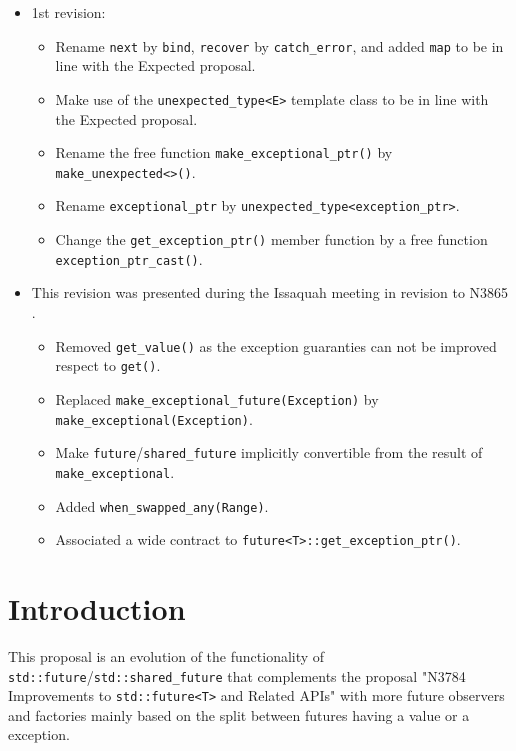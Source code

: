 \documentclass[a4paper,10pt]{article}
\newcommand{\cpp}[1]{\lstinline{#1}}
\newcommand{\update}[1]{\colorbox{update_color}{#1}}
\begin{document}
\begin{itemize}
\item \update{1st revision: }
\begin{itemize}
\item \update{Rename \cpp{next} by  \cpp{bind},  \cpp{recover} by  \cpp{catch_error}, and added  \cpp{map} to be in line with the Expected proposal.}
\item \update{Make use of the  \cpp{unexpected_type<E>} template class to be in line with the Expected proposal.}
\item \update{Rename the free function \cpp{make_exceptional_ptr()} by \cpp{make_unexpected<>()}.}
\item \update{Rename \cpp{exceptional_ptr} by  \cpp{unexpected_type<exception_ptr>}.}
\item \update{Change the \cpp{get_exception_ptr()} member function by a free function \cpp{exception_ptr_cast()}.}
\end{itemize}

\item This revision was presented during the Issaquah meeting in revision to N3865 \cite{N3865}.
\begin{itemize}
\item Removed \cpp{get_value()} as the exception guaranties can not be improved respect to \cpp{get()}. 
\item Replaced \cpp{make_exceptional_future(Exception)} by \cpp{make_exceptional(Exception)}. 
\item Make \cpp{future}/\cpp{shared_future} implicitly convertible from the result of \cpp{make_exceptional}. 
\item Added \cpp{when_swapped_any(Range)}. 
\item Associated a wide contract to \cpp{future<T>::get_exception_ptr()}.
\end{itemize}
\end{itemize}

\section{Introduction}

This proposal is an evolution of the functionality of \cpp{std::future}/\cpp{std::shared_future} that complements the proposal "N3784 Improvements to \cpp{std::future<T>} and Related APIs"  \cite{N3784} with more future observers and factories mainly based on the split between futures having a value or a exception.
\end{document}
